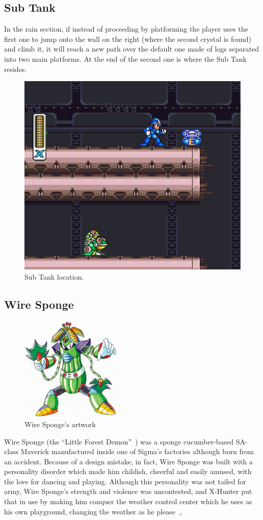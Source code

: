 \subsection{Sub Tank}
In the rain section, if instead of proceeding by platforming the player uses the first one to jump onto the wall on the right (where the second crystal is found) and climb it, it will reach a new path over the default one made of logs separated into two main platforms. At the end of the second one is where the Sub Tank resides.  
\begin{figure}[htp]
	\centering
	\includegraphics[width=0.4\linewidth]{figures/X2/Wire_sponge/Sponge_tank.jpg}
	\caption{Sub Tank location.}
\end{figure}

\subsection{Wire Sponge}\label{boss:Wire_sponge}
\begin{figure}[htp]
	\centering
	\includegraphics[height=5cm]{figures/X2/Wire_sponge/Wire_Sponge.png}
	\caption{Wire Sponge's artwork~\cite{book:MMX_Complete_art}}
\end{figure}
Wire Sponge (the ``Little Forest Demon''~\cite{book:MMX_Complete_art}) was a sponge cucumber-based SA-class Maverick manufactured inside one of Sigma's factories although born from an accident. Because of a design mistake, in fact, Wire Sponge was built with a personality disorder which made him childish, cheerful and easily amused, with the love for dancing and playing. Although this personality was not tailed for army, Wire Sponge's strength  and violence was uncontested, and X-Hunter put that in use by making him conquer the weather control center which he uses as his own playground, changing the weather as he please~\cite{wiki:wire_sponge},\cite{wayback:X2_resources}.


